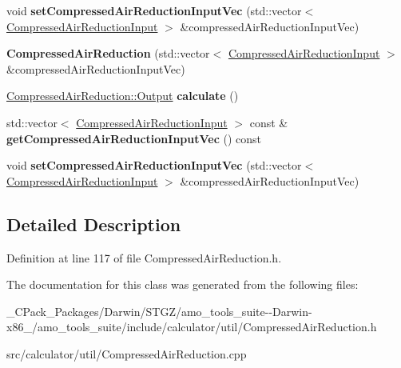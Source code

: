 \begin{DoxyCompactItemize}
\item 
\mbox{\label{class_compressed_air_reduction_a5ce8909011d63f84785014d7207a49de}} 
void {\bfseries set\+Compressed\+Air\+Reduction\+Input\+Vec} (std\+::vector$<$ \hyperlink{class_compressed_air_reduction_input}{Compressed\+Air\+Reduction\+Input} $>$ \&compressed\+Air\+Reduction\+Input\+Vec)
\item 
\mbox{\label{class_compressed_air_reduction_a94d9e61bf64e992c679c68510a21b6f2}} 
{\bfseries Compressed\+Air\+Reduction} (std\+::vector$<$ \hyperlink{class_compressed_air_reduction_input}{Compressed\+Air\+Reduction\+Input} $>$ \&compressed\+Air\+Reduction\+Input\+Vec)
\item 
\mbox{\label{class_compressed_air_reduction_a3d11a25bf311e886150d09cc308c47a2}} 
\hyperlink{struct_compressed_air_reduction_1_1_output}{Compressed\+Air\+Reduction\+::\+Output} {\bfseries calculate} ()
\item 
\mbox{\label{class_compressed_air_reduction_aad95f168b13d49824fbba687c7fa6ff9}} 
std\+::vector$<$ \hyperlink{class_compressed_air_reduction_input}{Compressed\+Air\+Reduction\+Input} $>$ const  \& {\bfseries get\+Compressed\+Air\+Reduction\+Input\+Vec} () const
\item 
\mbox{\label{class_compressed_air_reduction_a5ce8909011d63f84785014d7207a49de}} 
void {\bfseries set\+Compressed\+Air\+Reduction\+Input\+Vec} (std\+::vector$<$ \hyperlink{class_compressed_air_reduction_input}{Compressed\+Air\+Reduction\+Input} $>$ \&compressed\+Air\+Reduction\+Input\+Vec)
\end{DoxyCompactItemize}


\subsection{Detailed Description}


Definition at line 117 of file Compressed\+Air\+Reduction.\+h.



The documentation for this class was generated from the following files\+:\begin{DoxyCompactItemize}
\item 
\+\_\+\+C\+Pack\+\_\+\+Packages/\+Darwin/\+S\+T\+G\+Z/amo\+\_\+tools\+\_\+suite-\/-\/\+Darwin-\/x86\+\_/amo\+\_\+tools\+\_\+suite/include/calculator/util/Compressed\+Air\+Reduction.\+h\item 
src/calculator/util/Compressed\+Air\+Reduction.\+cpp\end{DoxyCompactItemize}

